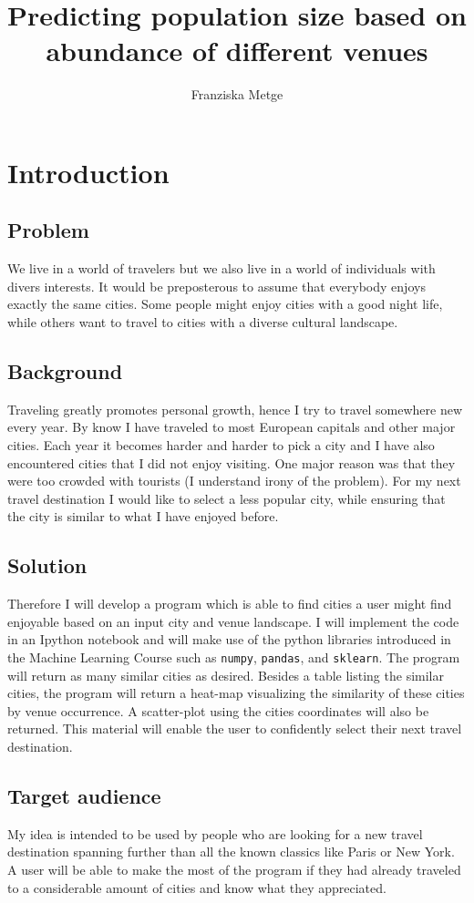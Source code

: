 \documentclass[11pt,a4paper,final]{article}
\author{Franziska Metge}
\title{Predicting population size based on abundance of different venues}
\begin{document}
\maketitle
\section{Introduction}
\subsection*{Problem}
We live in a world of travelers but we also live in a world of individuals with divers interests. It would be preposterous to assume that everybody enjoys exactly the same cities. Some people might enjoy cities with a good night life, while others want to travel to cities with a diverse cultural landscape. 

\subsection*{Background}
Traveling greatly promotes personal growth, hence I try to travel somewhere new every year. By know I have traveled to most European capitals and other major cities. Each year it becomes harder and harder to pick a city and I have also encountered cities that I did not enjoy visiting. One major reason was that they were too crowded with tourists (I understand irony of the problem). For my next travel destination I would like to select a less popular city, while ensuring that the city is similar to what I have enjoyed before. 

\subsection*{Solution}
Therefore I will develop a program which is able to find cities a user might find enjoyable based on an input city and venue landscape. I will implement the code in an Ipython notebook and will make use of the python libraries introduced in the Machine Learning Course such as \texttt{numpy}, \texttt{pandas}, and \texttt{sklearn}. The program will return as many similar cities as desired. Besides a table listing the similar cities, the program will return a heat-map visualizing the similarity of these cities by venue occurrence. A scatter-plot using the cities coordinates will also be returned. This material will enable the user to confidently select their next travel destination.

\subsection*{Target audience}
My idea is intended to be used by people who are looking for a new travel destination spanning further than all the known classics like Paris or New York. A user will be able to make the most of the program if they had already traveled to a considerable amount of cities and know what they appreciated. 
\end{document}
